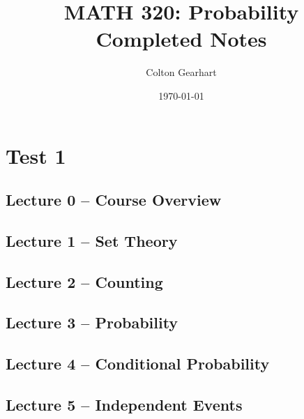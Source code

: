 \documentclass{article}
\title{MATH 320: Probability\\Completed Notes}
\author{Colton Gearhart}
\date{\today}
\begin{document}
\setcounter{secnumdepth}{0}		%
\maketitle
\dosecttoc
\tableofcontents
\newpage

\section{Test 1}

\secttoc

\subsection{Lecture 0 -- Course Overview}
\newpage

\subsection{Lecture 1 -- Set Theory}
\newpage

\subsection{Lecture 2 -- Counting}
\newpage

\subsection{Lecture 3 -- Probability}
\newpage

\subsection{Lecture 4 -- Conditional Probability}
\newpage

\subsection{Lecture 5 -- Independent Events}
\newpage
\end{document}
